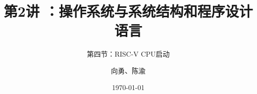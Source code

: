 


\title[第2讲]{第2讲 ：操作系统与系统结构和程序设计语言} %
\subtitle{第四节：RISC-V CPU启动}
\author{向勇、陈渝} %
\date{\today} %



\begin{frame}
\titlepage %
\end{frame}




